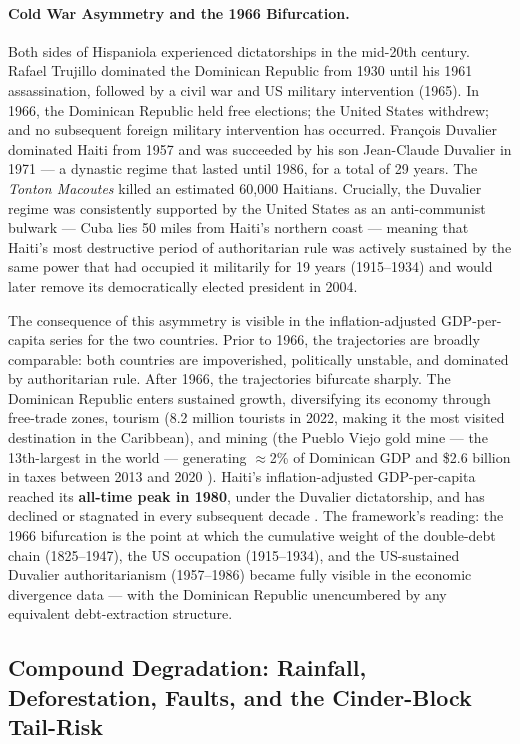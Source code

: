 \paragraph{Cold War Asymmetry and the 1966 Bifurcation.}
Both sides of Hispaniola experienced dictatorships in the mid-20th century. Rafael Trujillo dominated the Dominican Republic from 1930 until his 1961 assassination, followed by a civil war and US military intervention (1965). In 1966, the Dominican Republic held free elections; the United States withdrew; and no subsequent foreign military intervention has occurred. Fran\c{c}ois Duvalier dominated Haiti from 1957 and was succeeded by his son Jean-Claude Duvalier in 1971 --- a dynastic regime that lasted until 1986, for a total of 29 years. The \textit{Tonton Macoutes} killed an estimated 60,000 Haitians. Crucially, the Duvalier regime was consistently supported by the United States as an anti-communist bulwark --- Cuba lies 50 miles from Haiti's northern coast --- meaning that Haiti's most destructive period of authoritarian rule was actively sustained by the same power that had occupied it militarily for 19 years (1915--1934) and would later remove its democratically elected president in 2004.

The consequence of this asymmetry is visible in the inflation-adjusted GDP-per-capita series for the two countries. Prior to 1966, the trajectories are broadly comparable: both countries are impoverished, politically unstable, and dominated by authoritarian rule. After 1966, the trajectories bifurcate sharply. The Dominican Republic enters sustained growth, diversifying its economy through free-trade zones, tourism (8.2 million tourists in 2022, making it the most visited destination in the Caribbean), and mining (the Pueblo Viejo gold mine --- the 13th-largest in the world --- generating $\approx$2\% of Dominican GDP and \$2.6 billion in taxes between 2013 and 2020 \cite{pueblo_viejo_mine}). Haiti's inflation-adjusted GDP-per-capita reached its \textbf{all-time peak in 1980}, under the Duvalier dictatorship, and has declined or stagnated in every subsequent decade \cite{world_bank_wdi_2023}. The framework's reading: the 1966 bifurcation is the point at which the cumulative weight of the double-debt chain (1825--1947), the US occupation (1915--1934), and the US-sustained Duvalier authoritarianism (1957--1986) became fully visible in the economic divergence data --- with the Dominican Republic unencumbered by any equivalent debt-extraction structure.

\subsection{Compound Degradation: Rainfall, Deforestation, Faults, and the Cinder-Block Tail-Risk}
\label{sec:hispaniola_compound_degradation}

